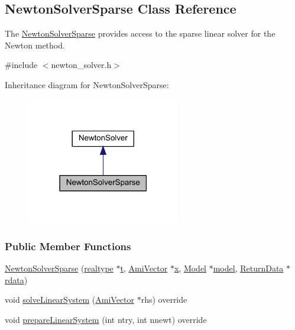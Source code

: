 \hypertarget{classamici_1_1_newton_solver_sparse}{}\subsection{Newton\+Solver\+Sparse Class Reference}
\label{classamici_1_1_newton_solver_sparse}


The \mbox{\hyperlink{classamici_1_1_newton_solver_sparse}{Newton\+Solver\+Sparse}} provides access to the sparse linear solver for the Newton method.  




{\ttfamily \#include $<$newton\+\_\+solver.\+h$>$}



Inheritance diagram for Newton\+Solver\+Sparse\+:
\nopagebreak
\begin{figure}[H]
\begin{center}
\leavevmode
\includegraphics[width=190pt]{classamici_1_1_newton_solver_sparse__inherit__graph}
\end{center}
\end{figure}
\subsubsection*{Public Member Functions}
\begin{DoxyCompactItemize}
\item 
\mbox{\hyperlink{classamici_1_1_newton_solver_sparse_ad06ef09394d6ac87fa34fa939a63da3b}{Newton\+Solver\+Sparse}} (\mbox{\hyperlink{namespaceamici_a1bdce28051d6a53868f7ccbf5f2c14a3}{realtype}} $\ast$\mbox{\hyperlink{classamici_1_1_newton_solver_ad94d61da9b85c1a151ffd8e228758c7c}{t}}, \mbox{\hyperlink{classamici_1_1_ami_vector}{Ami\+Vector}} $\ast$\mbox{\hyperlink{classamici_1_1_newton_solver_af64268982dd7b9be1690573763982e0b}{x}}, \mbox{\hyperlink{classamici_1_1_model}{Model}} $\ast$\mbox{\hyperlink{classamici_1_1_newton_solver_a7b56c3ca57dde73bdbc8dbe9772bca19}{model}}, \mbox{\hyperlink{classamici_1_1_return_data}{Return\+Data}} $\ast$\mbox{\hyperlink{classamici_1_1_newton_solver_a4c0807651f0594a186e8856f22e442cc}{rdata}})
\item 
void \mbox{\hyperlink{classamici_1_1_newton_solver_sparse_aa4a6695d71f00ec1b46e94b33e55660f}{solve\+Linear\+System}} (\mbox{\hyperlink{classamici_1_1_ami_vector}{Ami\+Vector}} $\ast$rhs) override
\item 
void \mbox{\hyperlink{classamici_1_1_newton_solver_sparse_a0b900656d018299b08d0f027e95bd347}{prepare\+Linear\+System}} (int ntry, int nnewt) override
\end{DoxyCompactItemize}
